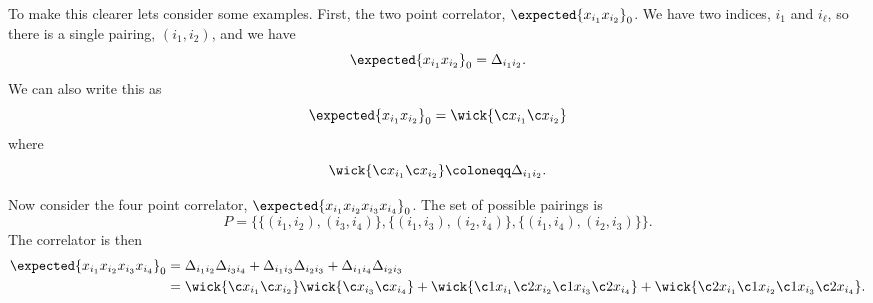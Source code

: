 \documentclass[fleqn]{NotesClass}
\begin{document}
    To make this clearer lets consider some examples.
    First, the two point correlator, \(\expected{x_{i_1}x_{i_2}}_0\).
    We have two indices, \(i_1\) and \(i_\ell\), so there is a single pairing, \((i_1, i_2)\), and we have
    \begin{equation}
        \expected{x_{i_1}x_{i_2}}_0 = \Delta_{i_1i_2}.
    \end{equation}
    We can also write this as
    \begin{equation}
        \expected{x_{i_1}x_{i_2}}_0 = \wick{\c x_{i_1} \c x_{i_2}}
    \end{equation}
    where
    \begin{equation}
        \wick{\c x_{i_1} \c x_{i_2}} \coloneqq \Delta_{i_1i_2}.
    \end{equation}
    
    Now consider the four point correlator, \(\expected{x_{i_1}x_{i_2}x_{i_3}x_{i_4}}_0\).
    The set of possible pairings is
    \begin{equation}
        P = \{\{(i_1, i_2), (i_3, i_4)\}, \{(i_1, i_3), (i_2, i_4)\}, \{(i_1, i_4), (i_2, i_3)\}\}.
    \end{equation}
    The correlator is then
    \begin{align}\label{eqn:4 point correlator}
        \expected{x_{i_1}x_{i_2}x_{i_3}x_{i_4}}_0 &= \Delta_{i_1i_2}\Delta_{i_3i_4} + \Delta_{i_1i_3}\Delta_{i_2i_3} + \Delta_{i_1i_4}\Delta_{i_2i_3}\\
        &= \wick{\c x_{i_1} \c x_{i_2}} \wick{\c x_{i_3} \c x_{i_4}} + \wick{\c1 x_{i_1} \c2 x_{i_2} \c1 x_{i_3} \c2 x_{i_4}} + \wick{\c2 x_{i_1} \c1 x_{i_2} \c1 x_{i_3} \c2 x_{i_4}}.
    \end{align}
    
\end{document}
